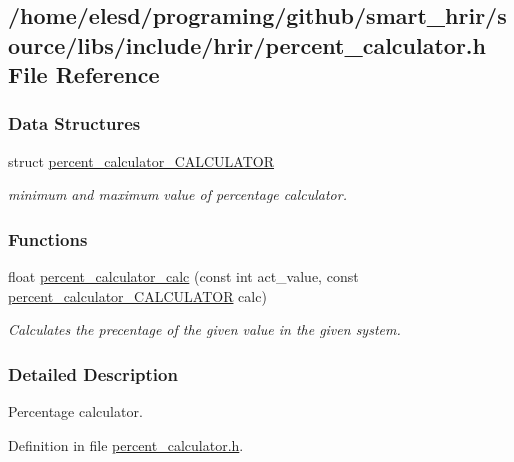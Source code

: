 \hypertarget{a00016}{\subsection{/home/elesd/programing/github/smart\-\_\-hrir/source/libs/include/hrir/percent\-\_\-calculator.h File Reference}
\label{a00016}
}
\subsubsection*{Data Structures}
\begin{DoxyCompactItemize}
\item 
struct \hyperlink{a00006}{percent\-\_\-calculator\-\_\-\-C\-A\-L\-C\-U\-L\-A\-T\-O\-R}
\begin{DoxyCompactList}\small\item\em minimum and maximum value of percentage calculator. \end{DoxyCompactList}\end{DoxyCompactItemize}
\subsubsection*{Functions}
\begin{DoxyCompactItemize}
\item 
float \hyperlink{a00016_a95a56d93980e355a86521f960320aa34}{percent\-\_\-calculator\-\_\-calc} (const int act\-\_\-value, const \hyperlink{a00006}{percent\-\_\-calculator\-\_\-\-C\-A\-L\-C\-U\-L\-A\-T\-O\-R} calc)
\begin{DoxyCompactList}\small\item\em Calculates the precentage of the given value in the given system. \end{DoxyCompactList}\end{DoxyCompactItemize}


\subsubsection{Detailed Description}
Percentage calculator. 

Definition in file \hyperlink{a00016_source}{percent\-\_\-calculator.\-h}.



